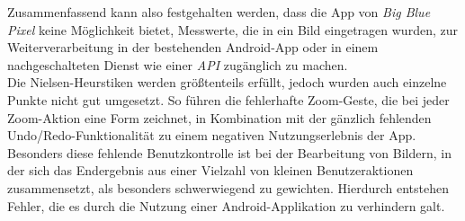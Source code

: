 Zusammenfassend kann also festgehalten werden, dass die App \pm{} von \emph{Big Blue Pixel} keine Möglichkeit bietet, Messwerte, die in ein Bild eingetragen wurden, zur Weiterverarbeitung
in der bestehenden Android-App oder in einem nachgeschalteten Dienst wie einer \emph{API} zugänglich zu machen. \\

Die Nielsen-Heurstiken werden größtenteils erfüllt, jedoch wurden auch einzelne Punkte nicht gut umgesetzt.
So führen die fehlerhafte Zoom-Geste, die bei jeder Zoom-Aktion eine Form zeichnet, in Kombination mit der gänzlich fehlenden Undo/Redo-Funktionalität zu einem negativen Nutzungserlebnis der App.
Besonders diese fehlende Benutzkontrolle ist bei der Bearbeitung von Bildern, in der sich das Endergebnis aus einer Vielzahl von kleinen Benutzeraktionen zusammensetzt, als besonders schwerwiegend zu gewichten.
Hierdurch entstehen Fehler, die es durch die Nutzung einer Android-Applikation zu verhindern galt.

